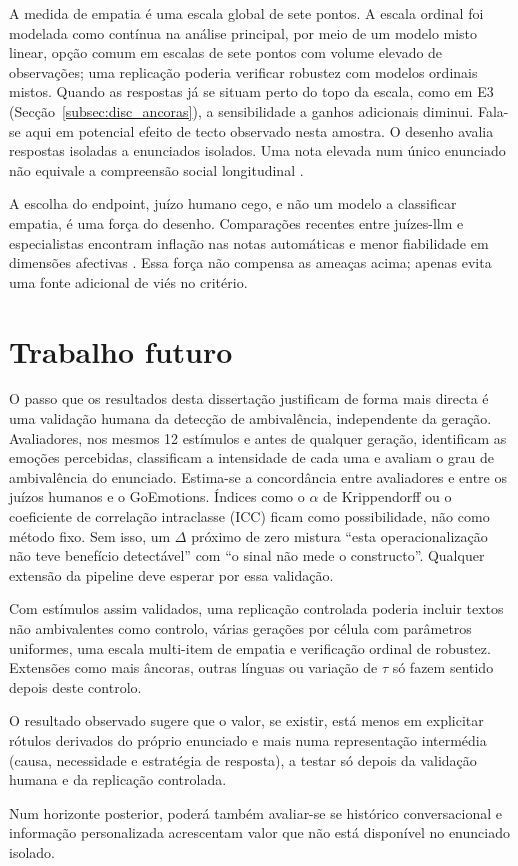 A medida de empatia é uma escala global de sete pontos. A escala ordinal foi modelada como contínua na análise principal, por meio de um modelo misto linear, opção comum em escalas de sete pontos com volume elevado de observações; uma replicação poderia verificar robustez com modelos ordinais mistos. Quando as respostas já se situam perto do topo da escala, como em E3 (Secção~\ref{subsec:disc_ancoras}), a sensibilidade a ganhos adicionais diminui. Fala-se aqui em potencial efeito de tecto observado nesta amostra. O desenho avalia respostas isoladas a enunciados isolados. Uma nota elevada num único enunciado não equivale a compreensão social longitudinal \parencite{Zhang2026SAGE}.

A escolha do endpoint, juízo humano cego, e não um modelo a classificar empatia, é uma força do desenho. Comparações recentes entre juízes-\gls{llm} e especialistas encontram inflação nas notas automáticas e menor fiabilidade em dimensões afectivas \parencite{Badawi2026MentalAlign}. Essa força não compensa as ameaças acima; apenas evita uma fonte adicional de viés no critério.


\section{Trabalho futuro}
\label{sec:conc_futuro}

O passo que os resultados desta dissertação justificam de forma mais directa é uma validação humana da detecção de ambivalência, independente da geração. Avaliadores, nos mesmos 12 estímulos e antes de qualquer geração, identificam as emoções percebidas, classificam a intensidade de cada uma e avaliam o grau de ambivalência do enunciado. Estima-se a concordância entre avaliadores e entre os juízos humanos e o GoEmotions. Índices como o \(\alpha\) de Krippendorff ou o coeficiente de correlação intraclasse (ICC) ficam como possibilidade, não como método fixo. Sem isso, um \(\Delta\) próximo de zero mistura ``esta operacionalização não teve benefício detectável'' com ``o sinal não mede o constructo''. Qualquer extensão da pipeline deve esperar por essa validação.

Com estímulos assim validados, uma replicação controlada poderia incluir textos não ambivalentes como controlo, várias gerações por célula com parâmetros uniformes, uma escala multi-item de empatia e verificação ordinal de robustez. Extensões como mais âncoras, outras línguas ou variação de \(\tau\) só fazem sentido depois deste controlo.

O resultado observado sugere que o valor, se existir, está menos em explicitar rótulos derivados do próprio enunciado e mais numa representação intermédia (causa, necessidade e estratégia de resposta), a testar só depois da validação humana e da replicação controlada.

Num horizonte posterior, poderá também avaliar-se se histórico conversacional e informação personalizada acrescentam valor que não está disponível no enunciado isolado.

